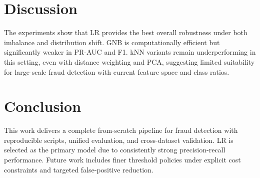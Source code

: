 \documentclass[conference]{IEEEtran}
\begin{document}
\section{Discussion}
The experiments show that LR provides the best overall robustness under both imbalance and distribution shift. GNB is computationally efficient but significantly weaker in PR-AUC and F1. kNN variants remain underperforming in this setting, even with distance weighting and PCA, suggesting limited suitability for large-scale fraud detection with current feature space and class ratios.

\section{Conclusion}
This work delivers a complete from-scratch pipeline for fraud detection with reproducible scripts, unified evaluation, and cross-dataset validation. LR is selected as the primary model due to consistently strong precision-recall performance. Future work includes finer threshold policies under explicit cost constraints and targeted false-positive reduction.



\end{document}
